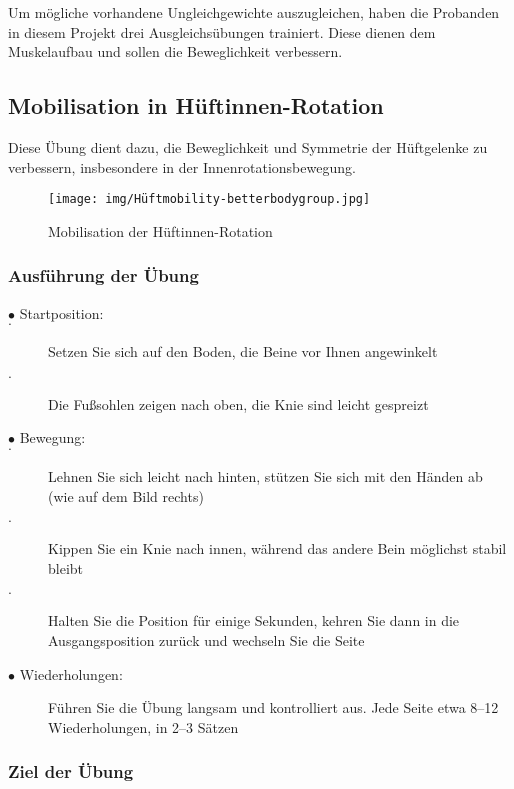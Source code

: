 Um mögliche vorhandene Ungleichgewichte auszugleichen, haben die Probanden in diesem Projekt drei Ausgleichsübungen trainiert. Diese dienen dem Muskelaufbau und sollen die Beweglichkeit verbessern.

\subsection{Mobilisation in Hüftinnen-Rotation}
Diese Übung dient dazu, die Beweglichkeit und Symmetrie der Hüftgelenke zu verbessern, insbesondere in der Innenrotationsbewegung.
\begin{figure}[h!]
    \centering
    \texttt{[image: img/Hüftmobility-betterbodygroup.jpg]}
    \caption{Mobilisation der Hüftinnen-Rotation \cite{betterbodygroup}}
    \label{Mobilisation der Hüftinnen-Rotation}
\end{figure}

\subsubsection{Ausführung der Übung}

\begin{description}
    \item[$\bullet$ Startposition:]
        \item[$\cdot$ ] Setzen Sie sich auf den Boden, die Beine vor Ihnen angewinkelt
        \item[$\cdot$] Die Fußsohlen zeigen nach oben, die Knie sind leicht gespreizt
    \item[$\bullet$ Bewegung:]
        \item[$\cdot$] Lehnen Sie sich leicht nach hinten, stützen Sie sich mit den Händen ab (wie auf dem Bild rechts)
        \item[$\cdot$]Kippen Sie ein Knie nach innen, während das andere Bein möglichst stabil bleibt
        \item[$\cdot$] Halten Sie die Position für einige Sekunden, kehren Sie dann in die Ausgangsposition zurück und wechseln Sie die Seite
    \item[$\bullet$ Wiederholungen:]Führen Sie die Übung langsam und kontrolliert aus. Jede Seite etwa 8–12 Wiederholungen, in 2–3 Sätzen
\end{description}

\subsubsection{Ziel der Übung}

